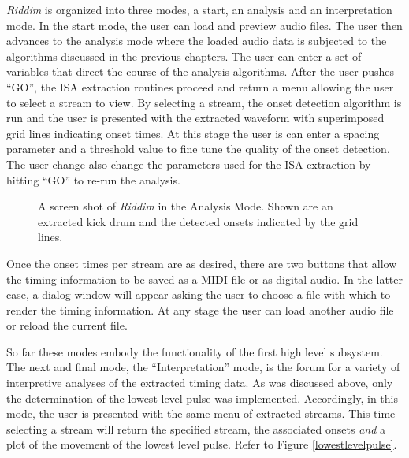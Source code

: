 {\it Riddim} is organized into three modes, a start, an analysis 
and an interpretation mode. In the start mode, the user can load and
preview audio files.  The user then advances to the analysis mode   
where the loaded audio data is subjected to the algorithms 
discussed in the previous chapters.  The user can enter a set
of variables that direct the course of the analysis algorithms. After
the user pushes ``GO'', the ISA extraction routines proceed and return a
menu allowing the user to select a stream to view. 
By selecting a stream, the onset detection algorithm is run and the 
user is presented with the extracted waveform with superimposed
grid lines indicating onset times. At this stage the
user is can enter a spacing parameter and a threshold value to
fine tune the quality of the onset detection. The user change also
change the parameters used for the ISA extraction by hitting
``GO'' to re-run the analysis. \begin{figure}[thp]
  \begin{center}
    \caption{A screen shot of {\it Riddim} in the Analysis Mode. Shown
      are an extracted kick drum and the detected onsets indicated by
      the grid lines.} 
    \label{Riddim Analysis Screen Shot}
  \end{center}
\end{figure}
Once the onset times per stream are 
as desired, there are two buttons that allow the timing
information to be saved as a MIDI file or as digital audio.  In the
latter case, a dialog window will appear asking the user to choose a 
file with which to render the timing information. At any stage the
user can load another audio file or reload the current file.

So far these modes embody the functionality of the first high level
subsystem. The next and final mode, the ``Interpretation'' mode, is the
forum for a variety of interpretive analyses of the extracted timing
data. As was discussed above, only the determination of the
lowest-level pulse was implemented. Accordingly, in this mode, the
user is presented with the same menu of extracted streams. This time 
selecting a stream will return the specified stream, the associated 
onsets {\sl and} a plot of the movement of the lowest level
pulse. Refer to Figure \ref{lowestlevelpulse}.


